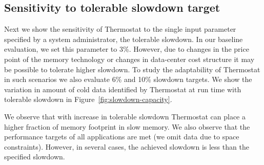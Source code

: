 %
%


\subsection{Sensitivity to tolerable slowdown target}
Next we show the sensitivity of Thermostat to the single input parameter
specified by a system administrator, the tolerable slowdown. In our baseline evaluation, we set this parameter to 3\%. However, due to changes in the
price point of the memory technology or changes in data-center cost structure
it may be  possible to tolerate higher slowdown. To study the adaptability of
Thermostat in such scenarios we also evaluate 6\% and 10\% slowdown targets. We show the variation in amount of cold data identified by
Thermostat at run time with tolerable slowdown in Figure~\ref{fig:slowdown-capacity}.

We observe that with increase in tolerable slowdown Thermostat can place a higher
fraction of memory footprint in slow memory. We also observe
that the performance targets of all applications are met (we omit data due to space
constraints). However, in several cases, the achieved slowdown is less than the
specified slowdown.

